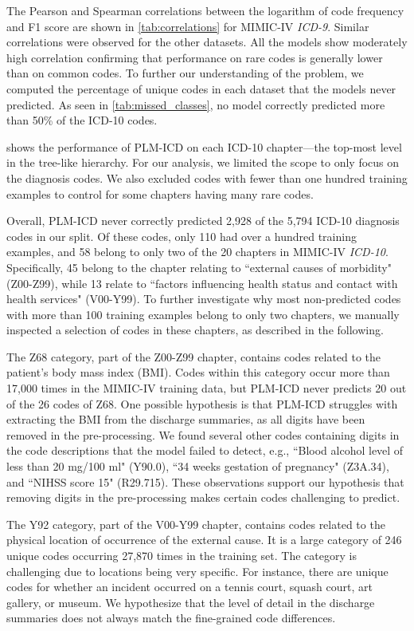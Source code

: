 {The Pearson and Spearman correlations between the logarithm of code frequency and F1 score are shown in \cref{tab:correlations} for MIMIC-IV \textit{ICD-9}. Similar correlations were observed for the other datasets. All the models show moderately high correlation confirming that performance on rare codes is generally lower than on common codes. To further our understanding of the problem, we computed the percentage of unique codes in each dataset that the models never predicted. As seen in \cref{tab:missed_classes}, no model correctly predicted more than 50\% of the ICD-10 codes.

 shows the performance of PLM-ICD on each ICD-10 chapter---the top-most level in the tree-like hierarchy. 
For our analysis, we limited the scope to only focus on the diagnosis codes. We also excluded codes with fewer than one hundred training examples to control for some chapters having many rare codes. 

Overall, PLM-ICD never correctly predicted 2,928 of the 5,794 ICD-10 diagnosis codes in our split. Of these codes, only 110 had over a hundred training examples, and 58 belong to only two of the 20 chapters in MIMIC-IV \textit{ICD-10}. Specifically, 45 belong to the chapter relating to ``external causes of morbidity" (Z00-Z99), while 13 relate to ``factors influencing health status and contact with health services" (V00-Y99). To further investigate why most non-predicted codes with more than 100 training examples belong to only two chapters, we manually inspected a selection of codes in these chapters, as described in the following.

The Z68 category, part of the Z00-Z99 chapter, contains codes related to the patient's body mass index (BMI). Codes within this category occur more than 17,000 times in the MIMIC-IV training data, but PLM-ICD never predicts 20 out of the 26 codes of Z68. One possible hypothesis is that PLM-ICD struggles with extracting the BMI from the discharge summaries, as all digits have been removed in the pre-processing. We found several other codes containing digits in the code descriptions that the model failed to detect, e.g., ``Blood alcohol level of less than 20 mg/100 ml" (Y90.0), ``34 weeks gestation of pregnancy" (Z3A.34), and ``NIHSS score 15" (R29.715). These observations support our hypothesis that removing digits in the pre-processing makes certain codes challenging to predict.

The Y92 category, part of the V00-Y99 chapter, contains codes related to the physical location of occurrence of the external cause. It is a large category of 246 unique codes occurring 27,870 times in the training set. The category is challenging due to locations being very specific. For instance, there are unique codes for whether an incident occurred on a tennis court, squash court, art gallery, or museum. We hypothesize that the level of detail in the discharge summaries does not always match the fine-grained code differences.

}
